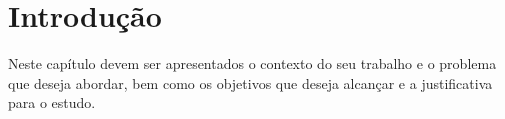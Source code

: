 


\chapter{Introdução}
    \label{cha:intro}    
    Neste capítulo devem ser apresentados o contexto do seu trabalho e o problema que deseja abordar, bem como os objetivos que deseja alcançar e a justificativa para o estudo.
    
    
    
    
    
    

